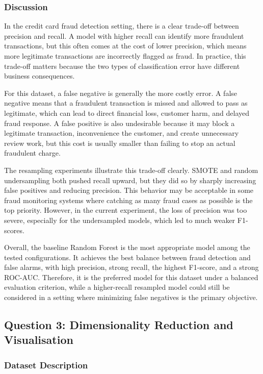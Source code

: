 \documentclass[11pt]{article}
\begin{document}
\subsubsection{Discussion}

In the credit card fraud detection setting, there is a clear trade-off between precision and recall. A model with higher recall can identify more fraudulent transactions, but this often comes at the cost of lower precision, which means more legitimate transactions are incorrectly flagged as fraud. In practice, this trade-off matters because the two types of classification error have different business consequences.

For this dataset, a false negative is generally the more costly error. A false negative means that a fraudulent transaction is missed and allowed to pass as legitimate, which can lead to direct financial loss, customer harm, and delayed fraud response. A false positive is also undesirable because it may block a legitimate transaction, inconvenience the customer, and create unnecessary review work, but this cost is usually smaller than failing to stop an actual fraudulent charge.

The resampling experiments illustrate this trade-off clearly. SMOTE and random undersampling both pushed recall upward, but they did so by sharply increasing false positives and reducing precision. This behavior may be acceptable in some fraud monitoring systems where catching as many fraud cases as possible is the top priority. However, in the current experiment, the loss of precision was too severe, especially for the undersampled models, which led to much weaker F1-scores.

Overall, the baseline Random Forest is the most appropriate model among the tested configurations. It achieves the best balance between fraud detection and false alarms, with high precision, strong recall, the highest F1-score, and a strong ROC-AUC. Therefore, it is the preferred model for this dataset under a balanced evaluation criterion, while a higher-recall resampled model could still be considered in a setting where minimizing false negatives is the primary objective.

\subsection{Question 3: Dimensionality Reduction and Visualisation}

\subsubsection{Dataset Description}
\end{document}
